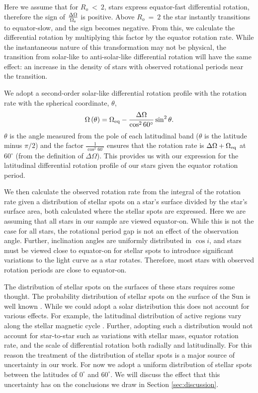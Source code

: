 Here we assume that for $R_o \ < \ 2$, stars express equator-fast differential rotation, therefore the sign of $\frac{\Delta \Omega}{\Omega_{\rm{s}}}$ is positive.
Above $R_o \ = \ 2$ the star instantly transitions to equator-slow, and the sign becomes negative. 
From this, we calculate the differential rotation by multiplying this factor by the equator rotation rate.
While the instantaneous nature of this transformation may not be physical, the transition from solar-like to anti-solar-like differential rotation will have the same effect: an increase in the density of stars with observed rotational periods near the transition.

We adopt a second-order solar-like differential rotation profile with the rotation rate with the spherical coordinate, $\theta$,
\begin{equation}
    \label{eq:obs_eq}
    \Omega\left(\theta\right) = \Omega_{\rm{eq}} - \frac{\Delta \Omega}{\cos^2 60^{\circ}} \sin^2{\theta}.
\end{equation}
$\theta$ is the angle measured from the pole of each latitudinal band ($\theta$ is the latitude minus $\pi/2$) and the factor $\frac{1}{\cos^2{60^{\circ}}}$ ensures that the rotation rate is $\Delta \Omega + \Omega_{\rm{eq}}$ at 60$^{\circ}$ (from the definition of $\Delta \Omega$).
This provides us with our expression for the latitudinal differential rotation profile of our stars given the equator rotation period.

We then calculate the observed rotation rate from the integral of the rotation rate given a distribution of stellar spots on a star's surface divided by the star's surface area, both calculated where the stellar spots are expressed.
Here we are assuming that all stars in our sample are viewed equator-on.
While this is not the case for all stars, the rotational period gap is not an effect of the observation angle.
Further, inclination angles are uniformly distributed in $\cos{i}$, and stars must be viewed close to equator-on for stellar spots to introduce significant variations to the light curve as a star rotates. 
Therefore, most stars with observed rotation periods are close to equator-on.

The distribution of stellar spots on the surfaces of these stars requires some thought.
The probability distribution of stellar spots on the surface of the Sun is well known \citep[see, e.g.,][]{maunder_note_1904,hathaway_solar_2015}.
While we could adopt a solar distribution this does not account for various effects.
For example, the latitudinal distribution of active regions vary along the stellar magnetic cycle \citep[see, e.g.,][ and references therein]{grijs_stellar_2021}.
Further, adopting such a distribution would not account for star-to-star such as variations with stellar mass, equator rotation rate,  and the scale of differential rotation both radially and latitudinally.
For this reason the treatment of the distribution of stellar spots is a major source of uncertainty in our work.
For now we adopt a uniform distribution of stellar spots between the latitudes of $0^{\circ}$ and $60^{\circ}$.
We will discuss the effect that this uncertainty has on the conclusions we draw in Section \ref{sec:discussion}.

